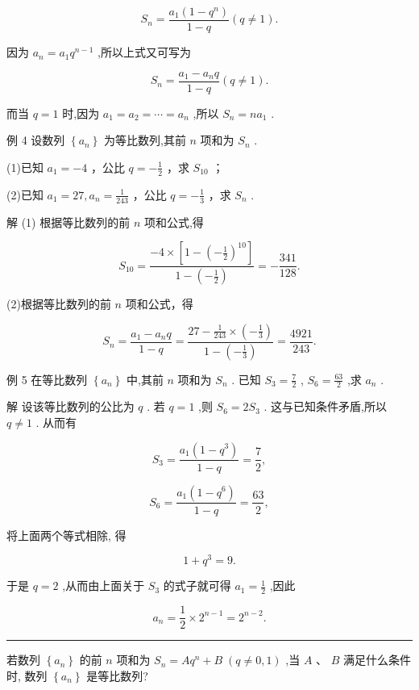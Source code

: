 \documentclass[10pt]{article}
\newcommand{\HRule}{\begin{center}\rule{0.9\linewidth}{0.2mm}\end{center}}
\begin{document}
\[
{S}_{n} = \frac{{a}_{1}\left( {1 - {q}^{n}}\right) }{1 - q}\left( {q \neq  1}\right) .
\]

因为 \({a}_{n} = {a}_{1}{q}^{n - 1}\) ,所以上式又可写为

\[
{S}_{n} = \frac{{a}_{1} - {a}_{n}q}{1 - q}\left( {q \neq  1}\right) .
\]

而当 \(q = 1\) 时,因为 \({a}_{1} = {a}_{2} = \cdots  = {a}_{n}\) ,所以 \({S}_{n} = n{a}_{1}\) .

例 4 设数列 \(\left\{  {a}_{n}\right\}\) 为等比数列,其前 \(n\) 项和为 \({S}_{n}\) .

(1)已知 \({a}_{1} =  - 4\) ，公比 \(q =  - \frac{1}{2}\) ，求 \({S}_{10}\) ；

(2)已知 \({a}_{1} = {27},{a}_{n} = \frac{1}{243}\) ，公比 \(q =  - \frac{1}{3}\) ，求 \({S}_{n}\) .

解 (1) 根据等比数列的前 \(n\) 项和公式,得

\[
{S}_{10} = \frac{-4 \times  \left\lbrack  {1 - {\left( -\frac{1}{2}\right) }^{10}}\right\rbrack  }{1 - \left( {-\frac{1}{2}}\right) } =  - \frac{341}{128}.
\]

(2)根据等比数列的前 \(n\) 项和公式，得

\[
{S}_{n} = \frac{{a}_{1} - {a}_{n}q}{1 - q} = \frac{{27} - \frac{1}{243} \times  \left( {-\frac{1}{3}}\right) }{1 - \left( {-\frac{1}{3}}\right) } = \frac{4921}{243}.
\]

例 5 在等比数列 \(\left\{  {a}_{n}\right\}\) 中,其前 \(n\) 项和为 \({S}_{n}\) . 已知 \({S}_{3} = \frac{7}{2}\) , \({S}_{6} = \frac{63}{2}\) ,求 \({a}_{n}\) .

解 设该等比数列的公比为 \(q\) . 若 \(q = 1\) ,则 \({S}_{6} = 2{S}_{3}\) . 这与已知条件矛盾,所以 \(q \neq  1\) . 从而有

\[
{S}_{3} = \frac{{a}_{1}\left( {1 - {q}^{3}}\right) }{1 - q} = \frac{7}{2},
\]

\[
{S}_{6} = \frac{{a}_{1}\left( {1 - {q}^{6}}\right) }{1 - q} = \frac{63}{2},
\]

将上面两个等式相除, 得

\[
1 + {q}^{3} = 9.
\]

于是 \(q = 2\) ,从而由上面关于 \({S}_{3}\) 的式子就可得 \({a}_{1} = \frac{1}{2}\) ,因此

\[
{a}_{n} = \frac{1}{2} \times  {2}^{n - 1} = {2}^{n - 2}.
\]

\HRule

若数列 \(\left\{  {a}_{n}\right\}\) 的前 \(n\) 项和为 \({S}_{n} = A{q}^{n} + B \; \left( {q \neq  0,1}\right)\) ,当 \(A\text{ 、 }B\) 满足什么条件时, 数列 \(\left\{  {a}_{n}\right\}\) 是等比数列?
\end{document}
